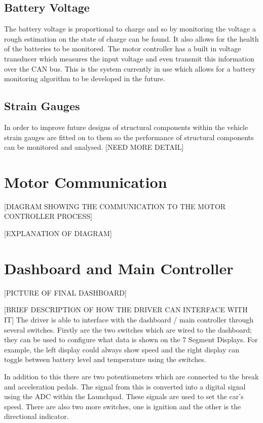 \documentclass[10pt,a4paper]{article}
\begin{document}
\subsection{Battery Voltage}

The battery voltage is proportional to charge and so by monitoring the voltage a rough estimation on the state of charge can be found. It also allows for the health of the batteries to be monitored. The motor controller has a built in voltage transducer which measures the input voltage and even transmit this information over the CAN bus. This is the system currently in use which allows for a battery monitoring algorithm to be developed in the future.

\subsection{Strain Gauges}
In order to improve future designs of structural components within the vehicle strain gauges are fitted on to them so the performance of structural components can be monitored and analysed. [NEED MORE DETAIL]

\section{Motor Communication}
[DIAGRAM SHOWING THE COMMUNICATION TO THE MOTOR CONTROLLER PROCESS]

[EXPLANATION OF DIAGRAM]

\section{Dashboard and Main Controller}
[PICTURE OF FINAL DASHBOARD]

[BRIEF DESCRIPTION OF HOW THE DRIVER CAN INTERFACE WITH IT]
The driver is able to interface with the dashboard / main controller through several switches. Firstly are the two switches which are wired to the dashboard; they can be used to configure what data is shown on the $7$ Segment Displays. For example, the left display could always show speed and the right display can toggle between battery level and temperature using the switches.

In addition to this there are two potentiometers which are connected to the break and acceleration pedals. The signal from this is converted into a digital signal using the ADC within the Launchpad. These signals are used to set the car's speed. There are also two more switches, one is ignition and the other is the directional indicator.
\end{document}
